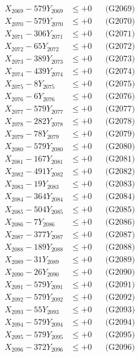 \documentclass[a4paper,10pt]{article}
\begin{document}
{\begin{align}
X_{2069} - 579Y_{2069} &\leq +0 && \text{(G2069)} \\
X_{2070} - 579Y_{2070} &\leq +0 && \text{(G2070)} \\
\allowbreak
X_{2071} - 306Y_{2071} &\leq +0 && \text{(G2071)} \\
X_{2072} - 65Y_{2072} &\leq +0 && \text{(G2072)} \\
X_{2073} - 389Y_{2073} &\leq +0 && \text{(G2073)} \\
X_{2074} - 439Y_{2074} &\leq +0 && \text{(G2074)} \\
X_{2075} - 8Y_{2075} &\leq +0 && \text{(G2075)} \\
X_{2076} - 6Y_{2076} &\leq +0 && \text{(G2076)} \\
X_{2077} - 579Y_{2077} &\leq +0 && \text{(G2077)} \\
X_{2078} - 282Y_{2078} &\leq +0 && \text{(G2078)} \\
X_{2079} - 78Y_{2079} &\leq +0 && \text{(G2079)} \\
X_{2080} - 579Y_{2080} &\leq +0 && \text{(G2080)} \\
\allowbreak
X_{2081} - 167Y_{2081} &\leq +0 && \text{(G2081)} \\
X_{2082} - 491Y_{2082} &\leq +0 && \text{(G2082)} \\
X_{2083} - 19Y_{2083} &\leq +0 && \text{(G2083)} \\
X_{2084} - 364Y_{2084} &\leq +0 && \text{(G2084)} \\
X_{2085} - 504Y_{2085} &\leq +0 && \text{(G2085)} \\
X_{2086} - 7Y_{2086} &\leq +0 && \text{(G2086)} \\
X_{2087} - 377Y_{2087} &\leq +0 && \text{(G2087)} \\
X_{2088} - 189Y_{2088} &\leq +0 && \text{(G2088)} \\
X_{2089} - 31Y_{2089} &\leq +0 && \text{(G2089)} \\
X_{2090} - 26Y_{2090} &\leq +0 && \text{(G2090)} \\
\allowbreak
X_{2091} - 579Y_{2091} &\leq +0 && \text{(G2091)} \\
X_{2092} - 579Y_{2092} &\leq +0 && \text{(G2092)} \\
X_{2093} - 55Y_{2093} &\leq +0 && \text{(G2093)} \\
X_{2094} - 579Y_{2094} &\leq +0 && \text{(G2094)} \\
X_{2095} - 579Y_{2095} &\leq +0 && \text{(G2095)} \\
X_{2096} - 372Y_{2096} &\leq +0 && \text{(G2096)} \\

\end{align}}
\end{document}
